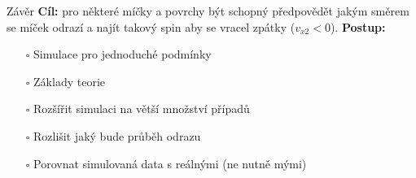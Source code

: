 \documentclass[secheader]{beamer}
\begin{document}
\begin{frame}{Závěr}
 \textbf{Cíl:} pro některé míčky a povrchy být schopný předpovědět jakým směrem
 se míček odrazí a najít takový spin aby se vracel zpátky ($v_{x2}<0$).
 \vfill
 \textbf{Postup:}\\
 \begin{itemize}
  \item[\rlap{\raisebox{0.3ex}{\hspace{0.4ex}\tiny \ding{52}}}$\square$]
  Simulace pro jednoduché podmínky
  
  \item[\rlap{\raisebox{0.3ex}{\hspace{0.4ex}\tiny \ding{52}}}$\square$]
  Základy teorie 
 \item[$\square$] Rozšířit simulaci na větší množství případů
 \item[$\square$] Rozlišit jaký bude průběh odrazu
 \item[$\square$] Porovnat simulovaná data s reálnými (ne nutně mými)
 \end{itemize}

\end{frame}
\end{document}
